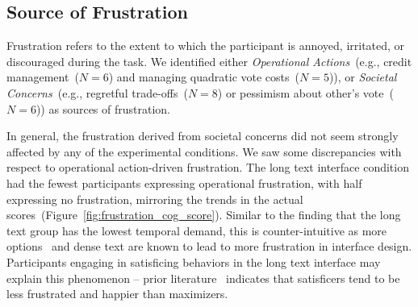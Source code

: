 
%

\subsection{Source of Frustration} 
\label{sec:frustration}


Frustration refers to the extent to which the participant is annoyed, irritated, or discouraged during the task. We identified either \textit{Operational Actions}~(e.g., credit management~($N=6$) and managing quadratic vote costs~($N=5$)), or \textit{Societal Concerns}~(e.g., regretful trade-offs~($N=8$) or pessimism about other's vote~($N=6$)) as sources of frustration.

In general, the frustration derived from societal concerns did not seem strongly affected by any of the experimental conditions. We saw some discrepancies with respect to operational action-driven frustration. The long text interface condition had the fewest participants expressing operational frustration, with half expressing no frustration, mirroring the trends in the actual scores~(Figure~\ref{fig:frustration_cog_score}). Similar to the finding that the long text group has the lowest temporal demand, this is counter-intuitive as more options~\cite{nielsen1997users} and dense text are known to lead to more frustration in interface design. Participants engaging in satisficing behaviors in the long text interface may explain this phenomenon -- prior literature~\cite{polmanWhyAreMaximizers2010, schwartzMaximizingSatisficingHappiness2002} indicates that satisficers tend to be less frustrated and happier than maximizers. 

